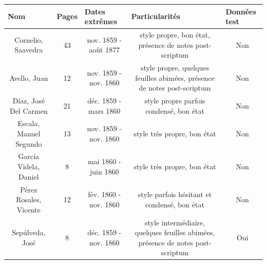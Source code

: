     \begin{table}[h!]
    \centering
    \begin{adjustbox}{max width=1\textwidth}
    \begin{tabular}{|c|c|ccc}
    \hline
    \multicolumn{1}{|l|}{\textbf{Nom}} & \multicolumn{1}{l|}{\textbf{Pages}} & \multicolumn{1}{l|}{\textbf{Dates extrêmes}}       & \multicolumn{1}{l|}{\textbf{Particularités}}                                                         & \multicolumn{1}{l|}{\textbf{Données test}} \\ \hline
    Cornelio, Saavedra                 & 43                                              & \multicolumn{1}{c|}{nov. 1859 - août 1877}     & \multicolumn{1}{c|}{style propre, bon état, présence de notes post-scriptum}                         & \multicolumn{1}{c|}{Non}                   \\ \hline
    Avello, Juan                       & 12                                              & \multicolumn{1}{c|}{nov. 1859 - nov. 1860} & \multicolumn{1}{c|}{style propre, quelques feuilles abimées, présence de notes post-scriptum}        & \multicolumn{1}{c|}{Non}                   \\ \hline
    Díaz, José Del Carmen              & 21                                              & \multicolumn{1}{c|}{déc. 1859 - mars 1860}     & \multicolumn{1}{c|}{style propre parfois condensé, bon état}                                         & \multicolumn{1}{c|}{Non}                   \\ \hline
    Escala, Manuel Segundo             & 13                                              & \multicolumn{1}{c|}{nov. 1859 - nov. 1860} & \multicolumn{1}{c|}{style très propre, bon état}                                                     & \multicolumn{1}{c|}{Non}                   \\ \hline
    García Videla, Daniel              & 8                                               & \multicolumn{1}{c|}{mai 1860 - juin 1860}          & \multicolumn{1}{c|}{style très propre, bon état}                                                     & \multicolumn{1}{c|}{Non}                   \\ \hline
    Pérez Rosales, Vicente             & 12                                              & \multicolumn{1}{c|}{fév. 1860 - nov. 1860}  & \multicolumn{1}{c|}{style parfois hésitant et condensé, bon état}                                    & \multicolumn{1}{c|}{Non}                   \\ \hline
    Sepúlveda, José                    & 8                                               & \multicolumn{1}{c|}{déc. 1859 -nov. 1860}  & \multicolumn{1}{c|}{style intermédiaire, quelques feuilles abimées, présence de notes post-scriptum} & \multicolumn{1}{c|}{Oui}                   \\ \hline

\end{tabular}
\end{adjustbox}
\end{table}
